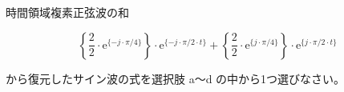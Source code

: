 時間領域複素正弦波の和

\[
\left \{ \frac{2}{2} \cdot \textrm{e}^{\{-j \cdot \pi/4 \}} \right \} \cdot \textrm{e}^{\{-j \cdot \pi/2 \cdot t \}}
+  \left \{ \frac{2}{2} \cdot \textrm{e}^{\{j  \cdot \pi/4 \}} \right \} \cdot \textrm{e}^{\{j \cdot \pi/2 \cdot t \}}
\]

\bigskip
\noindent から復元したサイン波の式を選択肢 a〜d の中から1つ選びなさい。
